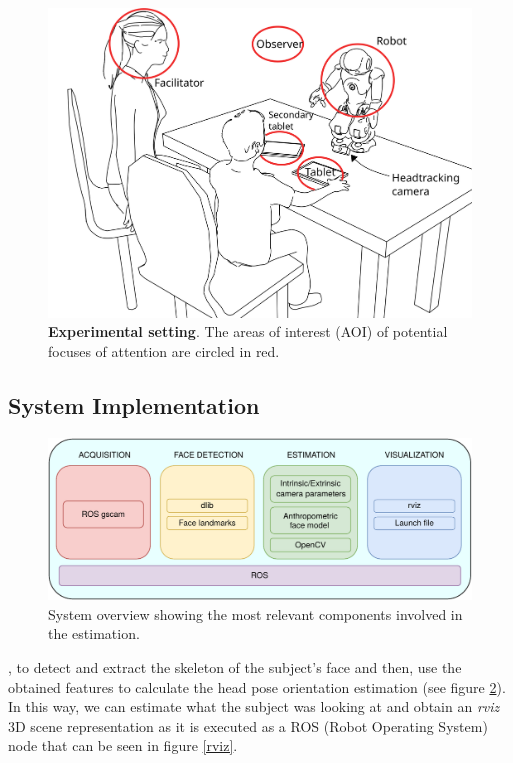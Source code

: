 \documentclass{sig-alternate}
\begin{document}
\begin{figure}[h!]
    \centering
    \includegraphics[width=0.8\columnwidth]{experimental_setup}
    \caption{\small \textbf{Experimental setting}. The areas of interest (AOI)
    of potential focuses of attention are circled in red.}
    \label{drawSetup}
\end{figure}

\subsection{System Implementation}
\label{sec:system}

\begin{figure}[h!]
    \centering
    \includegraphics[width=0.9\columnwidth]{system}
    \caption{\small System overview showing the most relevant components involved in the estimation.}
    \label{system}
\end{figure}


, to detect and extract the skeleton
of the subject's face and then, use the obtained features to calculate the
head pose orientation estimation (see figure \ref{system}). In this way, we can
estimate what the subject was looking at and obtain an \textit{rviz} 3D scene
representation as it is executed as a ROS (Robot Operating System) node that can
be seen in figure \ref{rviz}. 
\end{document}
